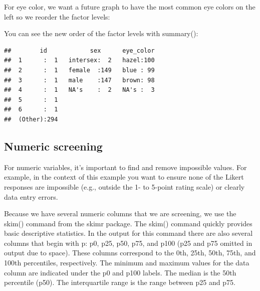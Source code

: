 \documentclass[
]{krantz}
\makeatletter
\newenvironment{Shaded}{\begin{snugshade}}{\end{snugshade}}
\newcommand{\DataTypeTok}[1]{\textcolor[rgb]{0.27,0.27,0.27}{#1}}
\newcommand{\KeywordTok}[1]{\textcolor[rgb]{0.27,0.27,0.27}{\textbf{#1}}}
\newcommand{\NormalTok}[1]{#1}
\newcommand{\OperatorTok}[1]{\textcolor[rgb]{0.43,0.43,0.43}{\textbf{#1}}}
\newcommand{\StringTok}[1]{\textcolor[rgb]{0.5,0.5,0.5}{#1}}
\newenvironment{kframe}{%
\medskip{}
\setlength{\fboxsep}{.8em}
 \def\at@end@of@kframe{}%
 \ifinner\ifhmode%
  \def\at@end@of@kframe{\end{minipage}}%
  \begin{minipage}{\columnwidth}%
 \fi\fi%
 \def\FrameCommand##1{\hskip\@totalleftmargin \hskip-\fboxsep
 \colorbox{shadecolor}{##1}\hskip-\fboxsep
     \hskip-\linewidth \hskip-\@totalleftmargin \hskip\columnwidth}%
 \MakeFramed {\advance\hsize-\width
   \@totalleftmargin\z@ \linewidth\hsize
   \@setminipage}}%
 {\par\unskip\endMakeFramed%
 \at@end@of@kframe}
\renewenvironment{Shaded}{\begin{kframe}}{\end{kframe}}
\makeatother
\begin{document}
For eye color, we want a future graph to have the most common eye colors on the left so we reorder the factor levels:

\begin{Shaded}
\end{Shaded}

You can see the new order of the factor levels with summary():

\begin{Shaded}
\end{Shaded}

\begin{verbatim}
##        id            sex      eye_color  
##  1      :  1   intersex:  2   hazel:100  
##  2      :  1   female  :149   blue : 99  
##  3      :  1   male    :147   brown: 98  
##  4      :  1   NA's    :  2   NA's :  3  
##  5      :  1                             
##  6      :  1                             
##  (Other):294
\end{verbatim}

\hypertarget{numeric-screening-3}{%
\subsection{Numeric screening}\label{numeric-screening-3}}

For numeric variables, it's important to find and remove impossible values. For example, in the context of this example you want to ensure none of the Likert responses are impossible (e.g., outside the 1- to 5-point rating scale) or clearly data entry errors.

Because we have several numeric columns that we are screening, we use the skim() command from the skimr package. The skim() command quickly provides basic descriptive statistics. In the output for this command there are also several columns that begin with p: p0, p25, p50, p75, and p100 (p25 and p75 omitted in output due to space). These columns correspond to the 0th, 25th, 50th, 75th, and 100th percentiles, respectively. The minimum and maximum values for the data column are indicated under the p0 and p100 labels. The median is the 50th percentile (p50). The interquartile range is the range between p25 and p75.
\end{document}
